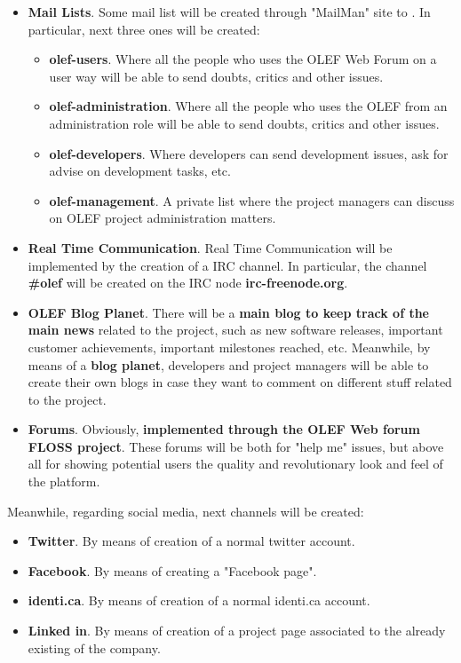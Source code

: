 \documentclass[11pt]{article}
\begin{document}
\begin{itemize}\itemsep0pt
\item{\textbf{Mail Lists}}. Some mail list will be created through "MailMan" site to . In particular, next three ones will be created:
\begin{itemize}\itemsep0pt
\item{\textbf{olef-users}}. Where all the people who uses the OLEF Web Forum on a user way will be able to send doubts, critics and other issues.
\item{\textbf{olef-administration}}. Where all the people who uses the OLEF from an administration role will be able to send doubts, critics and other issues.
\item{\textbf{olef-developers}}. Where developers can send development issues, ask for advise on development tasks, etc.
\item{\textbf{olef-management}}. A private list where the project managers can discuss on OLEF project administration matters.
\end{itemize}
\item{\textbf{Real Time Communication}}. Real Time Communication will be implemented by the creation of a IRC channel. In particular, the channel \textbf{\#olef} will be created on the IRC node \textbf{irc-freenode.org}.
\item{\textbf{OLEF Blog Planet}}. There will be a \textbf{main blog to keep track of the main news} related to the project, such as new software releases, important customer achievements, important milestones reached, etc. Meanwhile, by means of a \textbf{blog planet},  developers and project managers will be able to create their own blogs in case they want to comment on different stuff related to the project.
\item{\textbf{Forums}}. Obviously, \textbf{implemented through the OLEF Web forum FLOSS project}. These forums will be both for "help me" issues, but above all for showing potential users the quality and revolutionary look and feel of the platform.
\end{itemize}
Meanwhile, regarding social media, next channels will be created:
\begin{itemize}\itemsep0pt
\item{\textbf{Twitter}}. By means of creation of a normal twitter account.
\item{\textbf{Facebook}}. By means of creating a "Facebook page".
\item{\textbf{identi.ca}}. By means of creation of a normal identi.ca account.
\item{\textbf{Linked in}}. By means of creation of a project page associated to the already existing of the company.
\end{itemize}
\end{document}
